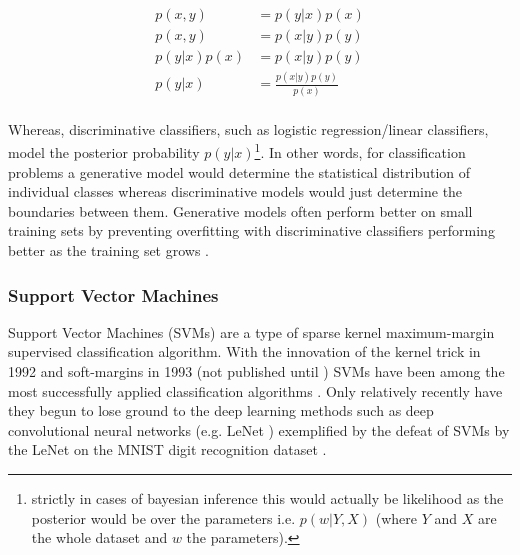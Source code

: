\begin{equation}
    \begin{aligned}
    p(x,y) &= p(y|x)p(x) \\
    p(x,y) &= p(x|y)p(y) \\
    p(y|x)p(x) &= p(x|y)p(y) \\
    p(y|x) &= \frac{p(x|y)p(y)}{p(x)}\\
    \end{aligned}
    \label{eq:bayes}
\end{equation}

Whereas, discriminative classifiers, such as logistic regression/linear classifiers,
model the posterior probability \(p(y|x)\)\footnote{strictly
    in cases of bayesian inference this would actually be likelihood
    as the posterior would be over the parameters i.e. \(p(w|Y,X)\) (where \(Y\) and \(X\) are the whole
dataset and \(w\) the parameters).}.
In other words, for classification problems a generative model would determine the statistical distribution of
individual classes whereas discriminative models would just determine the boundaries between them.
Generative models often perform better on small training sets by preventing overfitting with discriminative
classifiers performing better as the training set grows \citep{Ng2002}.

\subsubsection{Support Vector Machines}

Support Vector Machines (SVMs) are a type of sparse kernel maximum-margin supervised classification algorithm.
With the innovation of the kernel trick in 1992 \citep{Boser1992} and soft-margins in 1993 (not published until \citep{Cortes1995}) SVMs have been 
among the most successfully applied classification algorithms \citep{Fernandez-Delgado2014}.
Only relatively recently have they begun to lose ground to the deep learning methods such as deep convolutional neural networks (e.g. LeNet \citep{LeCun1998}) exemplified 
by the defeat of SVMs by the LeNet on the MNIST digit recognition dataset \citep{Hinton2006,Bengio2007,Bengio2013}.

